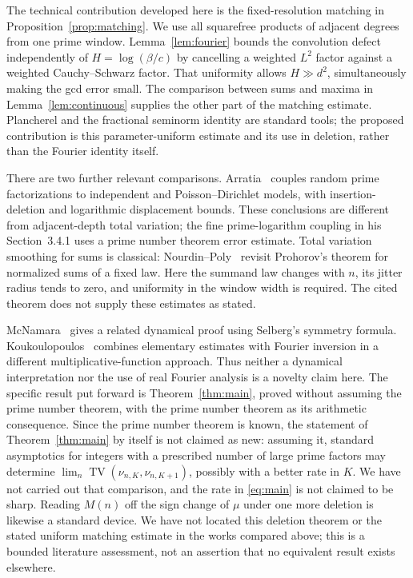 \documentclass[11pt]{article}
\theoremstyle{remark}\newtheorem{remark}[theorem]{Remark}
\DeclareMathOperator{\TV}{TV}
\begin{document}
The technical contribution developed here is the fixed-resolution matching in Proposition~\ref{prop:matching}. We use all squarefree products of adjacent degrees from one prime window. Lemma~\ref{lem:fourier} bounds the convolution defect independently of $H=\log(\beta/c)$ by cancelling a weighted $L^2$ factor against a weighted Cauchy--Schwarz factor. That uniformity allows $H\gg d^2$, simultaneously making the gcd error small. The comparison between sums and maxima in Lemma~\ref{lem:continuous} supplies the other part of the matching estimate. Plancherel and the fractional seminorm identity are standard tools; the proposed contribution is this parameter-uniform estimate and its use in deletion, rather than the Fourier identity itself.

There are two further relevant comparisons. Arratia~\cite[Sections~3.4--3.5 and Theorems~3,~5]{Arratia} couples random prime factorizations to independent and Poisson--Dirichlet models, with insertion-deletion and logarithmic displacement bounds. These conclusions are different from adjacent-depth total variation; the fine prime-logarithm coupling in his Section~3.4.1 uses a prime number theorem error estimate. Total variation smoothing for sums is classical: Nourdin--Poly~\cite[Theorem~1.2]{NP} revisit Prohorov's theorem for normalized sums of a fixed law. Here the summand law changes with $n$, its jitter radius tends to zero, and uniformity in the window width is required. The cited theorem does not supply these estimates as stated.

McNamara~\cite{McNamara} gives a related dynamical proof using Selberg's symmetry formula. Koukoulopoulos~\cite{Koukoulopoulos} combines elementary estimates with Fourier inversion in a different multiplicative-function approach. Thus neither a dynamical interpretation nor the use of real Fourier analysis is a novelty claim here. The specific result put forward is Theorem~\ref{thm:main}, proved without assuming the prime number theorem, with the prime number theorem as its arithmetic consequence. Since the prime number theorem is known, the statement of Theorem~\ref{thm:main} by itself is not claimed as new: assuming it, standard asymptotics for integers with a prescribed number of large prime factors may determine $\lim_{n}\TV(\nu_{n,K},\nu_{n,K+1})$, possibly with a better rate in $K$. We have not carried out that comparison, and the rate in \eqref{eq:main} is not claimed to be sharp. Reading $M(n)$ off the sign change of $\mu$ under one more deletion is likewise a standard device. We have not located this deletion theorem or the stated uniform matching estimate in the works compared above; this is a bounded literature assessment, not an assertion that no equivalent result exists elsewhere.
\end{document}
